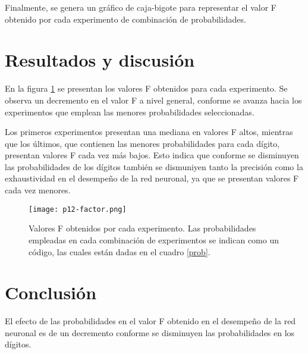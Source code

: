 \documentclass{article}
\begin{document}
Finalmente, se genera un gráfico de caja-bigote para representar el valor F obtenido por cada experimento de combinación de probabilidades.

\section{Resultados y discusión}
En la figura \ref{factor} se presentan los valores F obtenidos para cada experimento. Se observa un decremento en el valor F a nivel general, conforme se avanza hacia los experimentos que emplean las menores probabilidades seleccionadas. 

Los primeros experimentos presentan una mediana en valores F altos, mientras que los últimos, que contienen las menores probabilidades para cada dígito, presentan valores F cada vez más bajos. Esto indica que conforme se disminuyen las probabilidades de los dígitos también se dismuniyen tanto la precisión como la exhaustividad en el desempeño de la red neuronal, ya que se presentan valores F cada vez menores.

\begin{figure}[ptb]
\begin{center}
\texttt{[image: p12-factor.png]}
\end{center}
\caption{Valores F obtenidos por cada experimento. Las probabilidades empleadas en cada combinación de experimentos se indican como un código, las cuales están dadas en el cuadro \ref{prob}.\label{factor}}
\end{figure}

\section{Conclusión}
El efecto de las probabilidades en el valor F obtenido en el desempeño de la red neuronal es de un decremento conforme se disminuyen las probabilidades en los dígitos.



\end{document}
